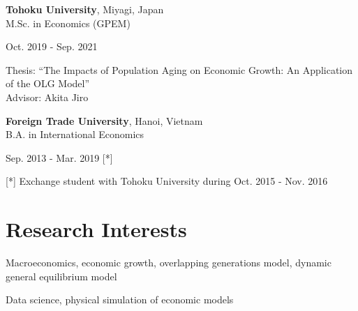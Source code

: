 \documentclass[a4paper,20pt]{article}
\begin{document}
	\begin{minipage}{.7\linewidth} \begin{flushleft}
			\textbf{Tohoku University}, Miyagi, Japan \\
			\hspace{4mm} M.Sc. in Economics (GPEM)\\
	\end{flushleft} \end{minipage}
	\hfill 
	\begin{minipage}{.25\linewidth}\begin{flushright}
			Oct. 2019 - Sep. 2021 \\
	\end{flushright}\end{minipage}
	
	\vspace{2pt}
	\hspace{4mm} Thesis: ``The Impacts of Population Aging on Economic Growth: An Application of the OLG Model'' \\
	\hspace{4mm} Advisor: Akita Jiro
	\vspace{4pt}
	
	\begin{minipage}{.7\linewidth} \begin{flushleft}
			\textbf{Foreign Trade University}, Hanoi, Vietnam \\
			\hspace{4mm} B.A. in International Economics
	\end{flushleft} \end{minipage}
	\hfill 
	\begin{minipage}{.25\linewidth}\begin{flushright}
			Sep. 2013 - Mar. 2019 [*] \\
	\end{flushright}\end{minipage}
	
	\vspace{2pt}
	\hspace{4mm} [*] Exchange student with Tohoku University during Oct. 2015 - Nov. 2016
	\vspace{4pt}
	
	\section{Research Interests}
	\begin{description}
		\item Macroeconomics, economic growth, overlapping generations model, dynamic general equilibrium model \\
		\vspace{-5pt}
		\item Data science, physical simulation of economic models
	\end{description}
	\vspace{0pt}
\end{document}
